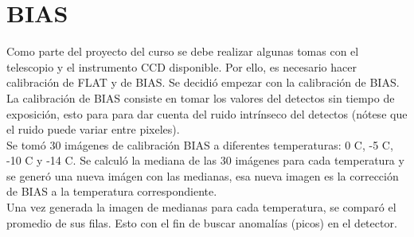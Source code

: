 \documentclass[12pt]{article}
\begin{document}
\newpage
\section{BIAS}
Como parte del proyecto del curso se debe realizar algunas tomas con el telescopio y el instrumento CCD disponible. Por ello, es necesario hacer calibración de FLAT y de BIAS. Se decidió empezar con la calibración de BIAS.\\

La calibración de BIAS consiste en tomar los valores del detectos sin tiempo de exposición, esto para para dar cuenta del ruido intrínseco del detectos (nótese que el ruido puede variar entre pixeles).\\

Se tomó 30 imágenes de calibración BIAS a diferentes temperaturas: 0 \degree C, -5 \degree C, -10 \degree C y -14 \degree C. Se calculó la mediana de las 30 imágenes para cada temperatura y se generó una nueva imágen con las medianas, esa nueva imagen es la corrección de BIAS a la temperatura correspondiente.\\

Una vez generada la imagen de medianas para cada temperatura, se comparó el promedio de sus filas. Esto con el fin de buscar anomalías (picos) en el detector.\\





{}

\end{document}

